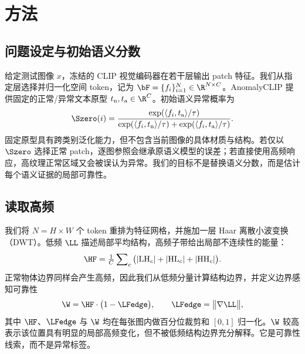 \section{方法}
\label{sec:method}

\subsection{问题设定与初始语义分数}
给定测试图像 $x$，冻结的 CLIP 视觉编码器在若干层输出 patch 特征。我们从指定层选择并归一化空间 token，记为
$\bF=\{f_i\}_{i=1}^{N}\in\R^{N\times C}$。AnomalyCLIP 提供固定的正常/异常文本原型
$t_{\mathrm n},t_{\mathrm a}\in\R^C$。初始语义异常概率为
\begin{equation}
\Szero(i)=
\frac{\exp(\langle f_i,t_{\mathrm a}\rangle/\tau)}
{\exp(\langle f_i,t_{\mathrm n}\rangle/\tau)+
 \exp(\langle f_i,t_{\mathrm a}\rangle/\tau)} .
\label{eq:s0}
\end{equation}
固定原型具有跨类别泛化能力，但不包含当前图像的具体材质与结构。若仅以 $\Szero$ 选择正常 patch，逐图参照会继承原语义模型的误差；若直接使用高频响应，高纹理正常区域又会被误认为异常。我们的目标不是替换语义分数，而是估计每个语义证据的局部可靠性。

\subsection{读取高频}
我们将 $N=H\times W$ 个 token 重排为特征网格，并施加一层 Haar 离散小波变换（DWT）。低频 $\LL$ 描述局部平均结构，高频子带给出局部不连续性的能量：
\begin{equation}
\HF = \tfrac{1}{C}\sum\nolimits_{c}\big(|\mathrm{LH}_c|+|\mathrm{HL}_c|+|\mathrm{HH}_c|\big).
\label{eq:hf}
\end{equation}
正常物体边界同样会产生高频，因此我们从低频分量计算结构边界，并定义边界感知可靠性
\begin{equation}
\W = \HF \cdot \big(1-\LFedge\big),\qquad \LFedge=\big\lVert\nabla \LL\big\rVert,
\label{eq:w}
\end{equation}
其中 $\HF$、$\LFedge$ 与 $\W$ 均在每张图内做百分位裁剪和 $[0,1]$ 归一化。$\W$ 较高表示该位置具有明显的局部高频变化，但不被低频结构边界充分解释。它是可靠性线索，而不是异常标签。


